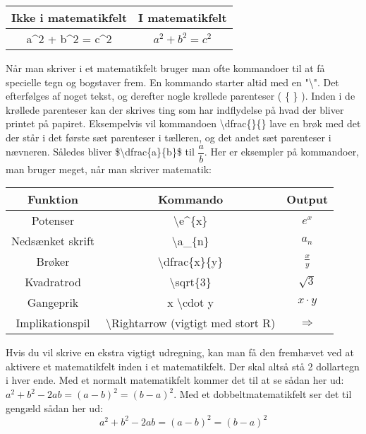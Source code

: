 \documentclass[titlepage]{article}
\begin{document}
\begin{center}
\begin{tabular}{|c|c|}
	\hline Ikke i matematikfelt & I matematikfelt\\ \hline
	a\^{}2 + b\^{}2 = c\^{}2 & $a^2 + b^2 = c^2$ \\ \hline
\end{tabular}
\end{center}

Når man skriver i et matematikfelt bruger man ofte kommandoer til at få specielle tegn og bogstaver frem.
En kommando starter altid med en "\textbackslash ".
Det efterfølges af noget tekst, og derefter nogle krøllede parenteser ( \{ \} ). 
Inden i de krøllede parenteser kan der skrives ting som har indflydelse på hvad der bliver printet på papiret. 
Eksempelvis vil kommandoen \textbackslash dfrac\{\}\{\} lave en brøk med det der står i det første sæt parenteser i tælleren, og det andet sæt parenteser i nævneren.
Således bliver \$\textbackslash dfrac\{a\}\{b\}\$ til $\dfrac{a}{b}$.
Her er eksempler på kommandoer, man bruger meget, når man skriver matematik:
\bigskip

\begin{center}
\begin{tabular}{|c|c|c|}
	 \hline
	 \textbf{Funktion} & \textbf{Kommando} & \textbf{Output} \\ \hline
	 Potenser & \textbackslash e\^{}\{x\} & $e^x$ \\ \hline
	 Nedsænket skrift & \textbackslash a\_\{n\} & $a_{n}$ \\ \hline
	 Brøker & \textbackslash dfrac\{x\}\{y\} & $\frac{x}{y}$ \\ \hline
	 Kvadratrod & \textbackslash sqrt\{3\} & $\sqrt{3}$\\ \hline
	 Gangeprik & x \textbackslash cdot y & $x \cdot y$\\ \hline
	 Implikationspil & \textbackslash Rightarrow (vigtigt med stort R) & $\Rightarrow$\\ \hline
\end{tabular}
\end{center}

Hvis du vil skrive en ekstra vigtigt udregning, kan man få den fremhævet ved at aktivere et matematikfelt inden i et matematikfelt. 
Der skal altså stå 2 dollartegn i hver ende. 
Med et normalt matematikfelt kommer det til at se sådan her ud: $a^2+b^2-2ab=(a-b)^2=(b-a)^2$. Med et dobbeltmatematikfelt ser det til gengæld sådan her ud: $$a^2+b^2-2ab=(a-b)^2=(b-a)^2$$
\end{document}
